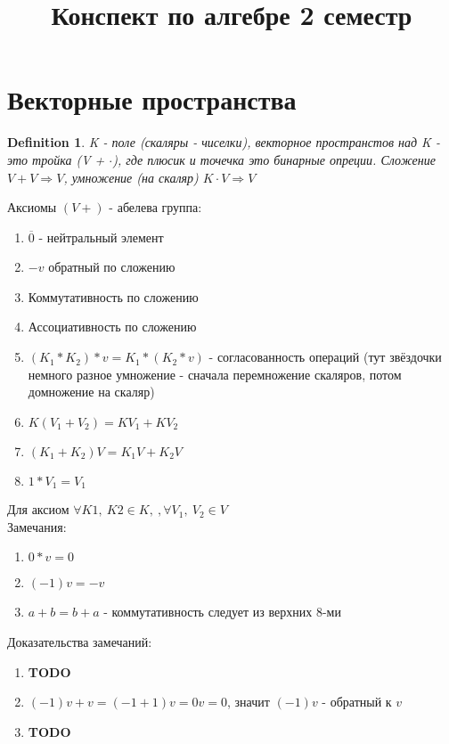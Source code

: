 \documentclass[12pt]{article}
\title{Конспект по алгебре 2 семестр}
\newtheorem{definition}{Definition}
\begin{document}
\maketitle
\section{Векторные пространства}
\begin{definition}
K - поле (скаляры - чиселки), векторное пространстов над K - это тройка (V + $\cdot$), где плюсик и точечка это бинарные опреции. Сложение $V + V \Rightarrow V$, умножение (на скаляр) $K \cdot V \Rightarrow V$
\end{definition}

Аксиомы $(V +)$ - абелева группа: \begin{enumerate}
    \item $\overline{0}$ - нейтральный элемент 
    \item $-v$ обратный по сложению
    \item Коммутативность по сложению
    \item Ассоциативность по сложению
    \item $(K_1 * K_2) * v = K_1 * ( K_2 * v)$ - согласованность операций (тут звёздочки немного разное умножение - сначала перемножение скаляров, потом домножение на скаляр)
    \item $K ( V_1 + V_2) = K V_1 + K V_2$
    \item $(K_1 + K_2) V = K_1V + K_2V$
    \item $1 * V_1 = V_1$
\end{enumerate} 
Для аксиом $\forall K1,\  K2 \in K, \ , \forall V_1, \ V_2 \in V$
\\

Замечания:
\begin{enumerate}
    \item  $0 * v = 0$
    \item $(-1) v = -v$ 
    \item $a + b = b + a$ - коммутативность следует из верхних 8-ми
\end{enumerate}
Доказательства замечаний: 
\begin{enumerate}
    \item \textbf{TODO}
    \item $(-1) v + v = (-1 + 1)v = 0 v = 0$, значит $(-1)v$ - обратный к $v$
    \item \textbf{TODO}
\end{enumerate}
\\
\end{document}
